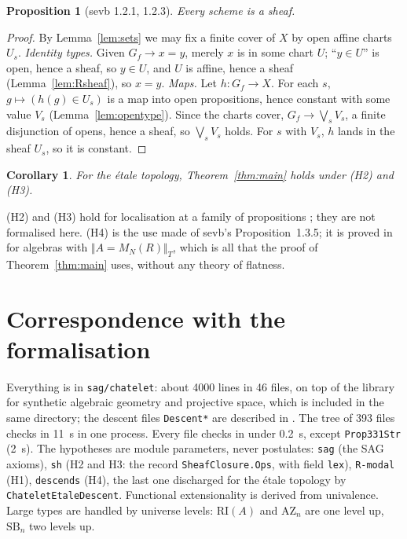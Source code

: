 \documentclass[11pt]{amsart}
\newtheorem{proposition}[theorem]{Proposition}
\newtheorem{corollary}[theorem]{Corollary}
\theoremstyle{definition}
\theoremstyle{remark}
\newcommand{\M}{M_N(R)}
\newcommand{\AZ}{\mathrm{AZ}_n}
\newcommand{\SB}{\mathrm{SB}_n}
\newcommand{\RI}{\mathrm{RI}}
\newcommand{\trT}[1]{\Vert #1\Vert_T}
\begin{document}
\begin{proposition}[sevb 1.2.1, 1.2.3]\label{prop:schemes}
Every scheme is a sheaf.
\end{proposition}
\begin{proof}
By Lemma~\ref{lem:sets} we may fix a finite cover of $X$ by open affine
charts $U_s$. \emph{Identity types.} Given $G_f\to x=y$, merely $x$ is in
some chart $U$; ``$y\in U$'' is open, hence a sheaf, so $y\in U$, and $U$ is
affine, hence a sheaf (Lemma~\ref{lem:Rsheaf}), so $x=y$. \emph{Maps.} Let
$h:G_f\to X$. For each $s$, $g\mapsto(h(g)\in U_s)$ is a map into open
propositions, hence constant with some value $V_s$
(Lemma~\ref{lem:opentype}). Since the charts cover, $G_f\to\bigvee_sV_s$, a
finite disjunction of opens, hence a sheaf, so $\bigvee_sV_s$ holds. For
$s$ with $V_s$, $h$ lands in the sheaf $U_s$, so it is constant.
\end{proof}

\begin{corollary}
For the \'etale topology, Theorem~\ref{thm:main} holds under (H2) and (H3).
\end{corollary}

(H2) and (H3) hold for localisation at a family of propositions
\cite{RSS20}; they are not formalised here. (H4) is the use made of sevb's
Proposition~1.3.5; it is proved in \cite{descent} for algebras with
$\trT{A=\M}$, which is all that the proof of Theorem~\ref{thm:main}
uses, without any theory of flatness.

\section{Correspondence with the formalisation}

Everything is in \texttt{sag/chatelet}: about 4000 lines in 46
files, on top of the library for synthetic algebraic geometry and
projective space, which is included in the same directory; the descent files
\texttt{Descent*} are described in \cite{descent}. The tree of 393 files
checks in 11~s in one process. Every file checks in under 0.2~s, except
\texttt{Prop331Str} (2~s). The hypotheses are module parameters, never
postulates:
\texttt{sag} (the SAG axioms), \texttt{sh} (H2 and H3: the record
\texttt{SheafClosure.Ops}, with field \texttt{lex}), \texttt{R-modal} (H1),
\texttt{descends} (H4), the last one discharged for the \'etale topology
by \texttt{ChateletEtaleDescent}. Functional extensionality is derived from
univalence. Large types are handled by universe levels: $\RI(A)$ and $\AZ$
are one level up, $\SB$ two levels up.
\end{document}
